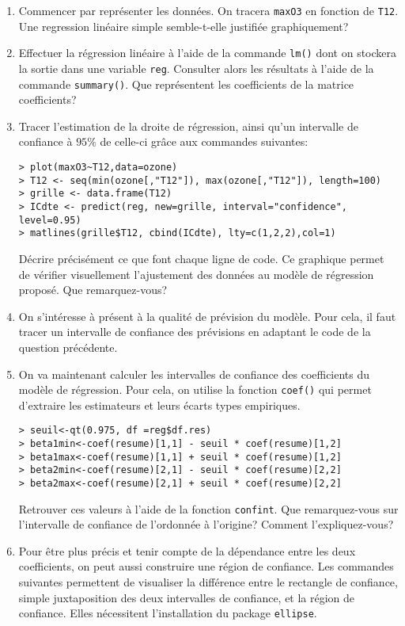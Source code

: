 \documentclass{td_um}
\providecommand{\1}{\mathds{1}}
\begin{document}
\begin{enumerate}
    \item Commencer par représenter les données. On tracera \texttt{maxO3} en fonction de \texttt{T12}. Une regression linéaire simple semble-t-elle justifiée graphiquement?
    \item Effectuer la régression linéaire à l'aide de la commande \texttt{lm()} dont on stockera la sortie dans une variable \texttt{reg}. Consulter alors les résultats à l'aide de la commande \texttt{summary()}. Que représentent les coefficients de la matrice coefficients?
\item Tracer l'estimation de la droite de régression, ainsi qu'un intervalle de confiance à $95 \%$ de celle-ci grâce aux commandes suivantes:
\begin{verbatim}
> plot(maxO3~T12,data=ozone)
> T12 <- seq(min(ozone[,"T12"]), max(ozone[,"T12"]), length=100)
> grille <- data.frame(T12)
> ICdte <- predict(reg, new=grille, interval="confidence", level=0.95)
> matlines(grille$T12, cbind(ICdte), lty=c(1,2,2),col=1)
\end{verbatim}
Décrire précisément ce que font chaque ligne de code. Ce graphique permet de vérifier visuellement l'ajustement des données au modèle de régression proposé. Que remarquez-vous?
\item On s'intéresse à présent à la qualité de prévision du modèle. Pour cela, il faut tracer un intervalle de confiance des prévisions en adaptant le code de la question précédente.
\item On va maintenant calculer les intervalles de confiance des coefficients du modèle de régression. Pour cela, on utilise la fonction \texttt{coef()} qui permet d'extraire les estimateurs et leurs écarts types empiriques.
\begin{verbatim}
> seuil<-qt(0.975, df =reg$df.res)
> beta1min<-coef(resume)[1,1] - seuil * coef(resume)[1,2]
> beta1max<-coef(resume)[1,1] + seuil * coef(resume)[1,2]
> beta2min<-coef(resume)[2,1] - seuil * coef(resume)[2,2]
> beta2max<-coef(resume)[2,1] + seuil * coef(resume)[2,2]
\end{verbatim}
Retrouver ces valeurs à l'aide de la fonction \texttt{confint}. Que remarquez-vous sur l'intervalle de confiance de l'ordonnée à l'origine? Comment l'expliquez-vous?
\item Pour être plus précis et tenir compte de la dépendance entre les deux coefficients, on peut aussi construire une région de confiance. Les commandes suivantes permettent de visualiser la différence entre le rectangle de confiance, simple juxtaposition des deux intervalles de confiance, et la région de confiance. Elles nécessitent l'installation du package \texttt{ellipse}.

\end{enumerate}
\end{document}
